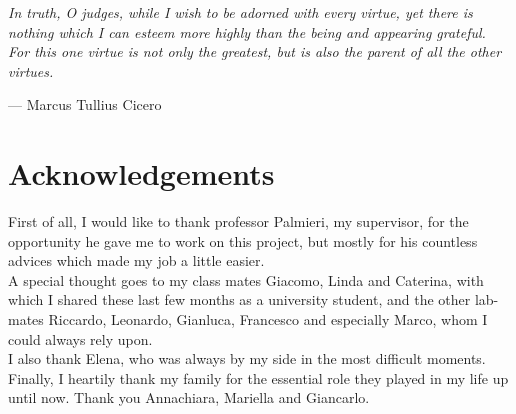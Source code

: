

\begin{flushright}{\slshape    
 In truth, O judges, while I wish to be adorned with every virtue, yet there is nothing which I can esteem more highly than the being and appearing grateful. For this one virtue is not only the greatest, but is also the parent of all the other virtues.} \medskip

--- Marcus Tullius Cicero
\end{flushright}
\bigskip


\begingroup

\let\clearpage\relax
\let\cleardoublepage\relax
\let\cleardoublepage\relax

\chapter*{Acknowledgements}

\noindent First of all, I would like to thank professor Palmieri, my supervisor, for the opportunity he gave me to work on this project, but mostly for his countless advices which made my job a little easier. \\

\noindent A special thought goes to my class mates Giacomo, Linda and Caterina, with which I shared these last few months as a university student, and the other lab-mates Riccardo, Leonardo, Gianluca, Francesco and especially Marco, whom I could always rely upon. \\

\noindent  I also thank Elena, who was always by my side in the most difficult moments. \\ 

\noindent Finally, I heartily thank my family for the essential role they played in my life up until now. Thank you Annachiara, Mariella and Giancarlo.  \\

\bigskip

\endgroup
